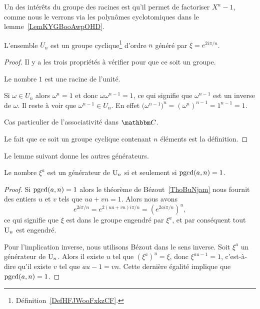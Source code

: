 Un des intérêts du groupe des racines est qu'il permet de factoriser \( X^n-1\), comme nous le verrons via les polynômes cyclotomiques dans le lemme~\ref{LemKYGBooAwpOHD}.

\begin{lemma}       \label{LemWHQGooXyeJiw}
    L'ensemble \( U_n\) est un groupe cyclique\footnote{Définition~\ref{DefHFJWooFxkzCF}.} d'ordre \( n\) généré par \( \xi= e^{2i\pi/n}\).
\end{lemma}

\begin{proof}
    Il y a les trois propriétés à vérifier pour que ce soit un groupe.
    \begin{subproof}
        \item[Neutre]
            Le nombre \( 1\) est une racine de l'unité.
    \item[Inverse]
        Si \( \omega\in U_n\) alors \( \omega^n=1\) et donc \( \omega\omega^{n-1}=1\), ce qui signifie que \( \omega^{n-1}\) est un inverse de \( \omega\). Il reste à voir que \( \omega^{n-1}\in U_n\). En effet \(  \big( \omega^{n-1} \big)^n=(\omega^n)^{n-1}=1^{n-1}=1  \).
    \item[Associativité]
        Cas particulier de l'associativité dans \( \eC\).
    \end{subproof}
    Le fait que ce soit un groupe cyclique contenant \( n\) éléments est la définition.
\end{proof}


Le lemme suivant donne les autres générateurs.
\begin{lemma}   \label{LemcFTNMa}
    Le nombre \( \xi^a\) est un générateur de \( \operatorname{U}_n\) si et seulement si \( \operatorname{pgcd}(a,n)=1\).
\end{lemma}

\begin{proof}
    Si \( \operatorname{pgcd}(a,n)=1\) alors le théorème de Bézout~\ref{ThoBuNjam} nous fournit des entiers \( u\) et \( v\) tels que \( ua+vn=1\). Alors nous avons
    \begin{equation}
        e^{2i\pi /n}= e^{2(ua+vn)i\pi/n}=( e^{2ai\pi/n})^u,
    \end{equation}
    ce qui signifie que \( \xi\) est dans le groupe engendré par \( \xi^a\), et par conséquent tout \( \operatorname{U}_n\) est engendré.

    Pour l'implication inverse, nous utilisons Bézout dans le sens inverse. Soit \( \xi^a\) un générateur de \( \operatorname{U}_n\). Alors il existe \( u\) tel que \( (\xi^a)^u=\xi\), donc \( \xi^{au-1}=1\), c'est-à-dire qu'il existe \( v\) tel que \( au-1=vn\). Cette dernière égalité implique que \( \operatorname{pgcd}(a,n)=1\).
\end{proof}


